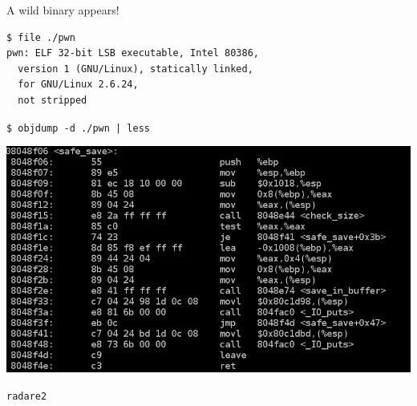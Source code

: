 \begin{frame}

  {\Huge A wild binary appears!}
  \vspace{1em}

  \begin{lstlisting}
$ file ./pwn
pwn: ELF 32-bit LSB executable, Intel 80386,
  version 1 (GNU/Linux), statically linked,
  for GNU/Linux 2.6.24,
  not stripped
  \end{lstlisting}

\end{frame}


\begin{frame}

  \huge
  \begin{center}
    \verb+$ objdump -d ./pwn | less+
  \end{center}
\end{frame}

{
\begin{frame}
  \begin{center}
    \includegraphics[width=\textwidth]{./images/objdump.png}
  \end{center}
\end{frame}
}

\begin{frame}[plain]
  \begin{center}
    {\Huge \texttt{radare2}}
  \end{center}
\end{frame}

